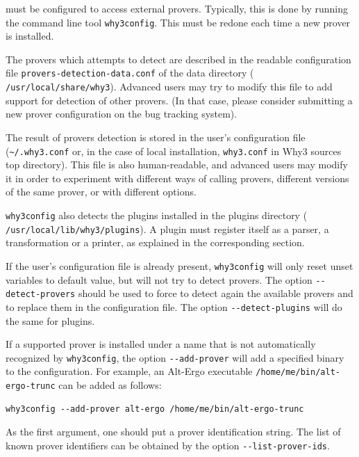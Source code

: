 \why must be configured to access external provers. Typically, this is done
by running
the command line tool \texttt{why3config}.
This must be redone each time a new prover is installed.

The provers which \why attempts to detect are described in
the readable configuration file \texttt{provers-detection-data.conf}
of the \why data directory (\eg{}
\texttt{/usr/local/share/why3}). Advanced users may try to modify this
file to add support for detection of other provers. (In that case,
please consider submitting a new prover configuration on the bug
tracking system).

The result of provers detection is stored in the user's
configuration file (\verb+~/.why3.conf+ or, in the case of local
installation, \verb+why3.conf+ in Why3 sources top directory). This file
is also human-readable, and advanced users may modify it in order to
experiment with different ways of calling provers, \eg{} different
versions of the same prover, or with different options.

\texttt{why3config} also detects the plugins installed in the \why
plugins directory (\eg{} \texttt{/usr/local/lib/why3/plugins}). A
plugin must register itself as a parser, a transformation or a
printer, as explained in the corresponding section.

If the user's configuration file is already present,
\texttt{why3config} will only reset unset variables to default value,
but will not try to detect provers.
The option \verb|--detect-provers| should be used to force
\why to detect again the available
provers and to replace them in the configuration file. The option
\verb|--detect-plugins| will do the same for plugins.

If a supported prover is installed under a name
that is not automatically recognized by \texttt{why3config},
the option \verb|--add-prover| will add a specified binary
to the configuration. For example, an Alt-Ergo executable
\verb|/home/me/bin/alt-ergo-trunc| can be added as follows:
\begin{verbatim}
why3config --add-prover alt-ergo /home/me/bin/alt-ergo-trunc
\end{verbatim}
As the first argument, one should put a prover
identification string. The list of known prover identifiers
can be obtained by the option \verb|--list-prover-ids|.

